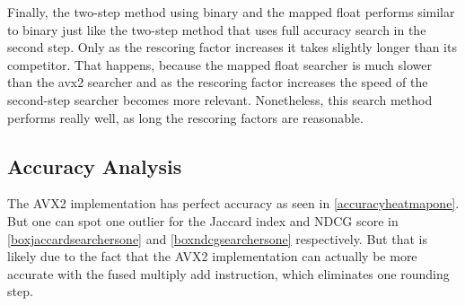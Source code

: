 Finally, the two-step method using binary and the mapped float performs similar to binary just like the two-step method that uses full accuracy search in the second step. Only as the rescoring factor increases it takes slightly longer than its competitor. That happens, because the mapped float searcher is much slower than the avx2 searcher and as the rescoring factor increases the speed of the second-step searcher becomes more relevant. Nonetheless, this search method performs really well, as long the rescoring factors are reasonable.

\subsection{Accuracy Analysis}
The AVX2 implementation has perfect accuracy as seen in \autoref{accuracyheatmapone}. But one can spot one outlier for the Jaccard index and NDCG score in \autoref{boxjaccardsearchersone} and \autoref{boxndcgsearchersone} respectively. But that is likely due to the fact that the AVX2 implementation can actually be more accurate with the fused multiply add instruction, which eliminates one rounding step.

